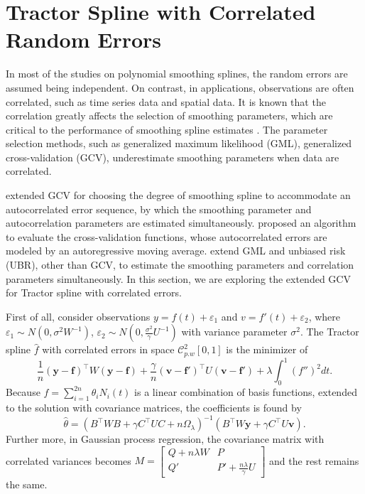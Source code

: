 \section{Tractor Spline with Correlated Random Errors}


In most of the studies on polynomial smoothing splines, the random errors are assumed being independent. On contrast, in applications, observations are often correlated, such as time series data and spatial data. It is known that the correlation greatly affects the selection of smoothing parameters, which are critical to the performance of smoothing spline estimates \cite{wang1998smoothing}.  The parameter selection methods, such as generalized maximum likelihood (GML), generalized cross-validation (GCV), underestimate smoothing parameters when data are correlated. 


\cite{diggle1989spline} extended GCV for choosing the degree of smoothing spline to accommodate an autocorrelated error sequence, by which the smoothing parameter and autocorrelation parameters are estimated simultaneously.  \cite{kohn1992nonparametric} proposed an algorithm to evaluate the cross-validation functions, whose autocorrelated errors are modeled by an autoregressive moving average. \cite{wang1998smoothing} extend GML and unbiased risk (UBR), other than GCV, to estimate the smoothing parameters and correlation parameters simultaneously. In this section, we are exploring the extended GCV for Tractor spline with correlated errors. 


First of all, consider observations $y=f(t)+\varepsilon_1$ and $v=f'(t)+\varepsilon_2$, where $\varepsilon_1\sim N(0,\sigma^2W^{-1})$, $\varepsilon_2\sim N(0,\frac{\sigma^2}{\gamma}U^{-1})$ with variance parameter $\sigma^2$. The Tractor spline $\hat{f}$ with correlated errors in space $\mathcal{C}_{p.w}^2[0,1]$ is the minimizer of 
\begin{equation}
\frac{1}{n}(\mathbf{y}-\mathbf{f})^\top W(\mathbf{y}-\mathbf{f})+\frac{\gamma}{n}(\mathbf{v}-\mathbf{f}')^\top U(\mathbf{v}-\mathbf{f}')+\lambda\int_0^1(f'')^2dt.
\end{equation}
Because $f=\sum_{i=1}^{2n}\theta_iN_i(t)$ is a linear combination of basis functions, extended to the solution with covariance matrices, the coefficients is found by 
\begin{equation}
\hat{\theta}=(B^\top W B+ \gamma C^\top UC+n\Omega_\lambda)^{-1}(B^\top W \mathbf{y}+\gamma C^\top U\mathbf{v}).
\end{equation}
Further more, in Gaussian process regression, the covariance matrix with correlated variances becomes 
$M=\begin{bmatrix}
Q+n\lambda W& P\\
Q'& P'+\frac{n\lambda}{\gamma}U
\end{bmatrix}$ and the rest remains the same. 



